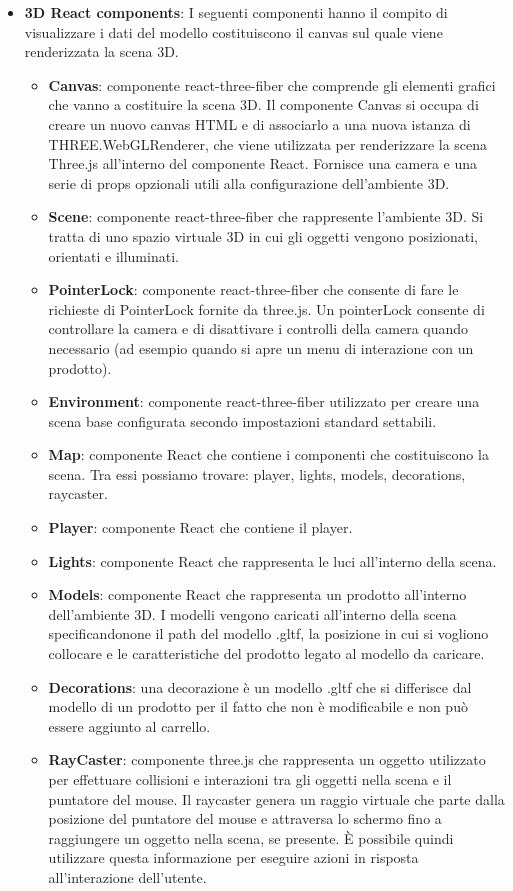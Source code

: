 \begin{itemize}
\begin{itemize}
		\end{itemize}
		\item \textbf{\large 3D React components}:
		I seguenti componenti hanno il compito di visualizzare i dati del modello costituiscono il canvas 
		sul quale viene renderizzata la scena 3D.
		\begin{itemize}
			\item \textbf{Canvas}: componente react-three-fiber che comprende gli elementi grafici che vanno a costituire
			la scena 3D.
			Il componente Canvas si occupa di creare un nuovo canvas HTML e di associarlo a una nuova istanza di THREE.WebGLRenderer, 
			che viene utilizzata per renderizzare la scena Three.js all'interno del componente React.
			Fornisce una camera e una serie di props opzionali utili alla configurazione dell'ambiente 3D.
			\item \textbf{Scene}: componente react-three-fiber che rappresente l'ambiente 3D.
			Si tratta di uno spazio virtuale 3D in cui gli oggetti vengono posizionati, orientati e illuminati.
			\item \textbf{PointerLock}: componente react-three-fiber che consente di fare le richieste di PointerLock fornite da
			three.js. 
			Un pointerLock consente di controllare la camera e di disattivare i controlli della camera quando 
			necessario (ad esempio quando si apre un menu di interazione con un prodotto).
			\item \textbf{Environment}: componente react-three-fiber utilizzato per creare una scena base configurata
			secondo impostazioni standard settabili.
			\item \textbf{Map}: componente React che contiene i componenti che costituiscono la scena.
			Tra essi possiamo trovare: player, lights, models, decorations, raycaster.
			\item \textbf{Player}: componente React che contiene il player.
			\item \textbf{Lights}: componente React che rappresenta le luci all'interno della scena.
			\item \textbf{Models}: componente React che rappresenta un prodotto all'interno dell'ambiente 3D.
			I modelli vengono caricati all'interno della scena specificandonone il path del modello .gltf, la posizione
			in cui si vogliono collocare e le caratteristiche del prodotto legato al modello da caricare.
			\item \textbf{Decorations}: una decorazione è un modello .gltf che si differisce dal modello di un prodotto 
			per il fatto che non è modificabile e non può essere aggiunto al carrello.
			\item \textbf{RayCaster}: componente three.js che rappresenta un oggetto utilizzato per effettuare 
			collisioni e interazioni tra gli oggetti nella scena e il puntatore del mouse.
			Il raycaster genera un raggio virtuale che parte dalla posizione del puntatore del mouse e attraversa lo schermo fino a 
			raggiungere un oggetto nella scena, se presente. 
			È possibile quindi utilizzare questa informazione per eseguire azioni in risposta all'interazione dell'utente.
		\end{itemize}
\end{itemize}
